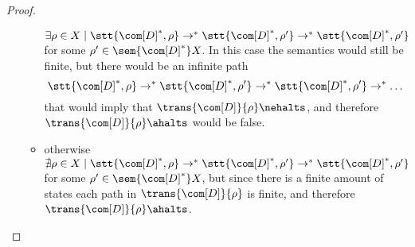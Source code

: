 \begin{proof}
\begin{itemize}
\begin{itemize}
      \(\exists \rho \in X \mid \stt{\com[D]^*, \rho} \to^*
      \stt{\com[D]^*, \rho'} \to^* \stt{\com[D]^*, \rho'}\) for some
      \(\rho'\in \sem{\com[D]^*}X\). In this case the semantics would
      still be finite, but there would be an infinite path
      \[\stt{\com[D]^*, \rho} \to^* \stt{\com[D]^*, \rho'} \to^*
        \stt{\com[D]^*, \rho'} \to^* \dots\] that would imply that
      \(\trans{\com[D]}{\rho} \nehalts\), and therefore
      \(\trans{\com[D]}{\rho} \ahalts\) would be false.
    \item otherwise
      \(\nexists \rho \in X \mid \stt{\com[D]^*, \rho} \to^*
      \stt{\com[D]^*, \rho'} \to^* \stt{\com[D]^*, \rho'}\) for some
      \(\rho'\in \sem{\com[D]^*}X\), but since there is a finite
      amount of states each path in \(\trans{\com[D]}{\rho}\) is
      finite, and therefore \(\trans{\com[D]}{\rho}\ahalts\).
    \end{itemize}
  \end{itemize}
\end{proof}
